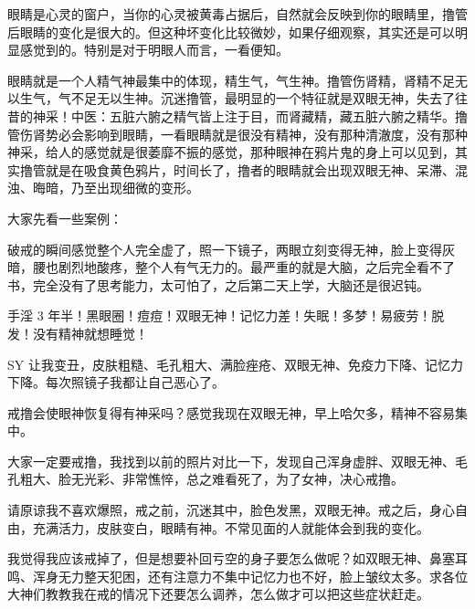 眼睛是心灵的窗户，当你的心灵被黄毒占据后，自然就会反映到你的眼睛里，撸管后眼睛的变化是很大的。但这种坏变化比较微妙，如果仔细观察，其实还是可以明显感觉到的。特别是对于明眼人而言，一看便知。

眼睛就是一个人精气神最集中的体现，精生气，气生神。撸管伤肾精，肾精不足无以生气，气不足无以生神。沉迷撸管，最明显的一个特征就是双眼无神，失去了往昔的神采！中医：五脏六腑之精气皆上注于目，而肾藏精，藏五脏六腑之精华。撸管伤肾势必会影响到眼睛，一看眼睛就是很没有精神，没有那种清澈度，没有那种神采，给人的感觉就是很萎靡不振的感觉，那种眼神在鸦片鬼的身上可以见到，其实撸管就是在吸食黄色鸦片，时间长了，撸者的眼睛就会出现双眼无神、呆滞、混浊、晦暗，乃至出现细微的变形。

大家先看一些案例：

\begin{case}[眼睛]
    破戒的瞬间感觉整个人完全虚了，照一下镜子，两眼立刻变得无神，脸上变得灰暗，腰也剧烈地酸疼，整个人有气无力的。最严重的就是大脑，之后完全看不了书，完全没有了思考能力，太可怕了，之后第二天上学，大脑还是很迟钝。
\end{case}

\begin{case}[眼睛]
    手淫 3 年半！黑眼圈！痘痘！双眼无神！记忆力差！失眠！多梦！易疲劳！脱发！没有精神就想睡觉！
\end{case}

\begin{case}[眼睛]
    SY 让我变丑，皮肤粗糙、毛孔粗大、满脸痤疮、双眼无神、免疫力下降、记忆力下降。每次照镜子我都让自己恶心了。
\end{case}

\begin{case}[眼睛]
    戒撸会使眼神恢复得有神采吗？感觉我现在双眼无神，早上哈欠多，精神不容易集中。
\end{case}

\begin{case}[眼睛]
    大家一定要戒撸，我找到以前的照片对比一下，发现自己浑身虚胖、双眼无神、毛孔粗大、脸无光彩、非常憔悴，总之难看死了，为了女神，决心戒撸。
\end{case}

\begin{case}[眼睛]
    请原谅我不喜欢爆照，戒之前，沉迷其中，脸色发黑，双眼无神。戒之后，身心自由，充满活力，皮肤变白，眼睛有神。不常见面的人就能体会到我的变化。
\end{case}

\begin{case}[眼睛]
    我觉得我应该戒掉了，但是想要补回亏空的身子要怎么做呢？如双眼无神、鼻塞耳鸣、浑身无力整天犯困，还有注意力不集中记忆力也不好，脸上皱纹太多。求各位大神们教教我在戒的情况下还要怎么调养，怎么做才可以把这些症状赶走。
\end{case}


